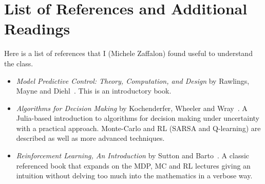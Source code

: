 \chapter*{List of References and Additional Readings}
\label{chap:references}

Here is a list of references that I (Michele Zaffalon) found useful to understand the class.
\begin{itemize}
\item \textit{Model Predictive Control: Theory, Computation, and Design} by Rawlings, Mayne and Diehl~\cite{MPC-diehl}. This is an introductory book.
\item \textit{Algorithms for Decision Making} by Kochenderfer, Wheeler and Wray~\cite{decision-making-kochenderfer}. A Julia-based introduction to algorithms for decision making under uncertainty with a practical approach. Monte-Carlo and RL (SARSA and Q-learning) are described as well as more advanced techniques.
\item \textit{Reinforcement Learning, An Introduction} by Sutton and Barto~\cite{reinforcement-learning-sutton-barto}. A classic referenced book that expands on the MDP, MC and RL lectures giving an intuition without delving too much into the mathematics in a verbose way.
\end{itemize}



